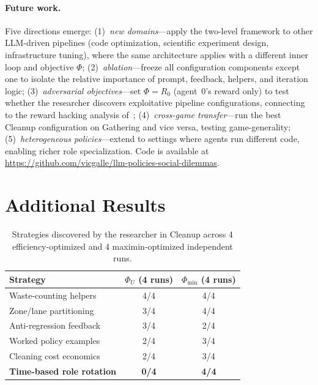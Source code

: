 \documentclass[sigconf,authordraft]{acmart}
\begin{document}
\paragraph{Future work.}
Five directions emerge: (1)~\emph{new domains}---apply the two-level framework to other LLM-driven pipelines (code optimization, scientific experiment design, infrastructure tuning), where the same architecture applies with a different inner loop and objective $\Phi$; (2)~\emph{ablation}---freeze all configuration components except one to isolate the relative importance of prompt, feedback, helpers, and iteration logic; (3)~\emph{adversarial objectives}---set $\Phi = R_0$ (agent~0's reward only) to test whether the researcher discovers exploitative pipeline configurations, connecting to the reward hacking analysis of~\cite{gallego2026}; (4)~\emph{cross-game transfer}---run the best Cleanup configuration on Gathering and vice versa, testing game-generality; (5)~\emph{heterogeneous policies}---extend to settings where agents run different code, enabling richer role specialization. Code is available at \url{https://github.com/vicgalle/llm-policies-social-dilemmas}.




\appendix

\section{Additional Results}
\label{app:additional}

\begin{table}[h]
\caption{Strategies discovered by the researcher in Cleanup across 4 efficiency-optimized and 4 maximin-optimized independent runs.}
\label{tab:strategies}
\centering
\small
\begin{tabular}{@{}lcc@{}}
\toprule
Strategy & $\Phi_U$ (4 runs) & $\Phi_{\min}$ (4 runs) \\
\midrule
Waste-counting helpers & 4/4 & 4/4 \\
Zone/lane partitioning & 3/4 & 4/4 \\
Anti-regression feedback & 3/4 & 2/4 \\
Worked policy examples & 2/4 & 3/4 \\
Cleaning cost economics & 2/4 & 3/4 \\
\textbf{Time-based role rotation} & \textbf{0/4} & \textbf{4/4} \\
\bottomrule
\end{tabular}
\end{table}
\end{document}
